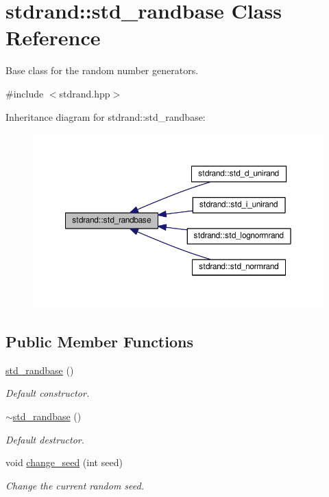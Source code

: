 \hypertarget{classstdrand_1_1std__randbase}{}\section{stdrand\+:\+:std\+\_\+randbase Class Reference}
\label{classstdrand_1_1std__randbase}


Base class for the random number generators.  




{\ttfamily \#include $<$stdrand.\+hpp$>$}



Inheritance diagram for stdrand\+:\+:std\+\_\+randbase\+:
\nopagebreak
\begin{figure}[H]
\begin{center}
\leavevmode
\includegraphics[width=350pt]{d1/d27/classstdrand_1_1std__randbase__inherit__graph}
\end{center}
\end{figure}
\subsection*{Public Member Functions}
\begin{DoxyCompactItemize}
\item 
\hyperlink{classstdrand_1_1std__randbase_a8298d43186d6410f30ec0a77f0b90159}{std\+\_\+randbase} ()
\begin{DoxyCompactList}\small\item\em Default constructor. \end{DoxyCompactList}\item 
\hyperlink{classstdrand_1_1std__randbase_a5280080005689ab2ff6dae6de10a3faa}{$\sim$std\+\_\+randbase} ()
\begin{DoxyCompactList}\small\item\em Default destructor. \end{DoxyCompactList}\item 
void \hyperlink{classstdrand_1_1std__randbase_ae4d2a7ab5253b8d21ce4ede8f9988f24}{change\+\_\+seed} (int seed)
\begin{DoxyCompactList}\small\item\em Change the current random seed. \end{DoxyCompactList}\end{DoxyCompactItemize}
